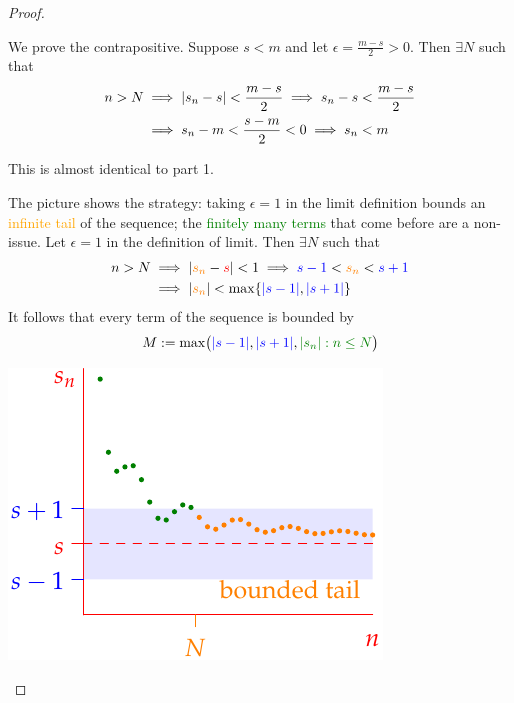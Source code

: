 \begin{proof}
	\begin{enumerate}
	  \item We prove the contrapositive. Suppose $s<m$ and let $\epsilon=\frac{m-s}2>0$. Then $\exists N$ such that
		\begin{align*}
			n>N&\implies \left| s_n-s\right|<\frac{m-s}2\implies s_n-s<\frac{m-s}2\\
			&\implies s_n-m<\frac{s-m}2<0 \implies s_n<m
		\end{align*}
		
		\item This is almost identical to part 1.
	
	  \begin{minipage}[t]{0.6\linewidth}\vspace{-5pt}
			\item The picture shows the strategy: taking $\epsilon=1$ in the limit definition bounds an \textcolor{orange}{infinite tail} of the sequence; the \textcolor{Green}{finitely many terms} that come before are a non-issue.\smallbreak
			Let $\epsilon=1$ in the definition of	limit. Then $\exists N$ such that
			\begin{align*}
				n>N&\implies \left| \textcolor{orange}{s_n}-\textcolor{red}{s}\right|<1 \implies \textcolor{blue}{s-1}<\textcolor{orange}{s_n}<\textcolor{blue}{s+1}\\
				&\implies \left| \textcolor{orange}{s_n}\right|<\max\{\textcolor{blue}{\left| s-1\right|},\textcolor{blue}{\left| s+1\right|}\}
			\end{align*}
			It follows that every term of the sequence is bounded by
			\[
				M:=\max\bigl(\textcolor{blue}{\nm{s-1}},\textcolor{blue}{\nm{s+1}}, \textcolor{Green}{\nm{s_n}:n\le N}\bigr)
			\]
		\end{minipage}
		\hfill
		\begin{minipage}[t]{0.39\linewidth}\vspace{-5pt}
			\flushright\includegraphics[scale=0.95]{convbdd}
		\end{minipage} 
	\end{enumerate}
\end{proof}

